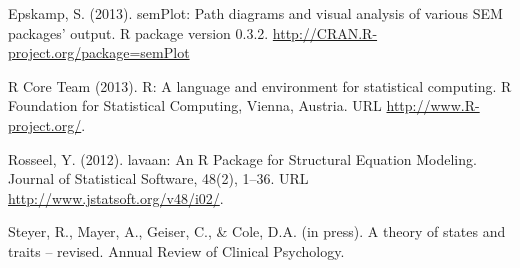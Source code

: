 \documentclass[10pt]{article}\usepackage{graphicx, color}
\begin{document}
\begin{description}
\item Epskamp, S. (2013). semPlot: Path diagrams and visual analysis of various
  SEM packages' output. R package version 0.3.2.  \url{http://CRAN.R-project.org/package=semPlot}
\item R Core Team (2013). R: A language and environment for statistical computing.
  R Foundation for Statistical Computing, Vienna, Austria. URL \url{http://www.R-project.org/}.
\item Rosseel, Y. (2012). lavaan: An R Package for Structural Equation Modeling.
  Journal of Statistical Software, 48(2), 1--36. URL  \url{http://www.jstatsoft.org/v48/i02/}.
\item Steyer, R., Mayer, A., Geiser, C., \& Cole, D.A. (in press). A theory of states and traits -- revised. Annual Review of Clinical Psychology.
\end{description}
\end{document}
